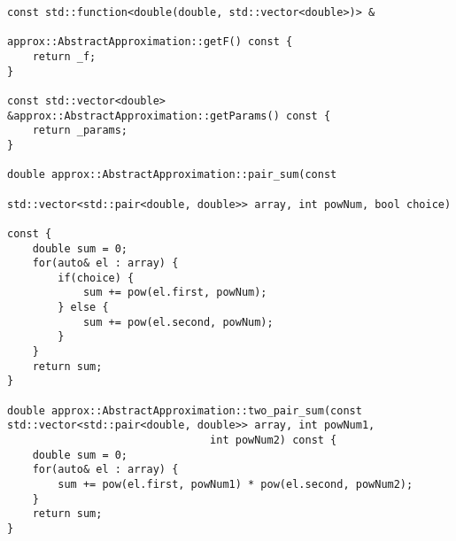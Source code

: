 \begin{lstlisting}
const std::function<double(double, std::vector<double>)> & 

approx::AbstractApproximation::getF() const {
    return _f;
}

const std::vector<double> 
&approx::AbstractApproximation::getParams() const {
    return _params;
}

double approx::AbstractApproximation::pair_sum(const 

std::vector<std::pair<double, double>> array, int powNum, bool choice) 

const {
    double sum = 0;
    for(auto& el : array) {
        if(choice) {
            sum += pow(el.first, powNum);
        } else {
            sum += pow(el.second, powNum);
        }
    }
    return sum;
}

double approx::AbstractApproximation::two_pair_sum(const 
std::vector<std::pair<double, double>> array, int powNum1,
                                int powNum2) const {
    double sum = 0;
    for(auto& el : array) {
        sum += pow(el.first, powNum1) * pow(el.second, powNum2);
    }
    return sum;
}

\end{lstlisting}
